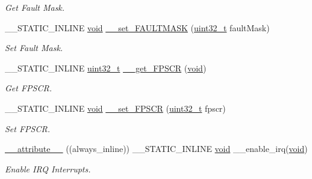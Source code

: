 \begin{DoxyCompactItemize}
\begin{DoxyCompactList}\small\item\em Get Fault Mask. \end{DoxyCompactList}\item 
\-\_\-\-\_\-\-S\-T\-A\-T\-I\-C\-\_\-\-I\-N\-L\-I\-N\-E \hyperlink{group___n_a_m_e_ga18028b8badbf1ea7e704ccac3c488e82}{void} \hyperlink{group___c_m_s_i_s___core___reg_acc_functions_gaa5587cc09031053a40a35c14ec36078a}{\-\_\-\-\_\-set\-\_\-\-F\-A\-U\-L\-T\-M\-A\-S\-K} (\hyperlink{stdint_8h_a435d1572bf3f880d55459d9805097f62}{uint32\-\_\-t} fault\-Mask)
\begin{DoxyCompactList}\small\item\em Set Fault Mask. \end{DoxyCompactList}\item 
\-\_\-\-\_\-\-S\-T\-A\-T\-I\-C\-\_\-\-I\-N\-L\-I\-N\-E \hyperlink{stdint_8h_a435d1572bf3f880d55459d9805097f62}{uint32\-\_\-t} \hyperlink{group___c_m_s_i_s___core___reg_acc_functions_ga6a275172e274ea7ce6c22030d07c6c64}{\-\_\-\-\_\-get\-\_\-\-F\-P\-S\-C\-R} (\hyperlink{group___n_a_m_e_ga18028b8badbf1ea7e704ccac3c488e82}{void})
\begin{DoxyCompactList}\small\item\em Get F\-P\-S\-C\-R. \end{DoxyCompactList}\item 
\-\_\-\-\_\-\-S\-T\-A\-T\-I\-C\-\_\-\-I\-N\-L\-I\-N\-E \hyperlink{group___n_a_m_e_ga18028b8badbf1ea7e704ccac3c488e82}{void} \hyperlink{group___c_m_s_i_s___core___reg_acc_functions_ga17c6ff443c52c74125fefef7de5fee1d}{\-\_\-\-\_\-set\-\_\-\-F\-P\-S\-C\-R} (\hyperlink{stdint_8h_a435d1572bf3f880d55459d9805097f62}{uint32\-\_\-t} fpscr)
\begin{DoxyCompactList}\small\item\em Set F\-P\-S\-C\-R. \end{DoxyCompactList}\item 
\hyperlink{group___c_m_s_i_s___core___reg_acc_functions_ga671b4fa3b3ab3dbc685a5473f3fc76aa}{\-\_\-\-\_\-attribute\-\_\-\-\_\-} ((always\-\_\-inline)) \-\_\-\-\_\-\-S\-T\-A\-T\-I\-C\-\_\-\-I\-N\-L\-I\-N\-E \hyperlink{group___n_a_m_e_ga18028b8badbf1ea7e704ccac3c488e82}{void} \-\_\-\-\_\-enable\-\_\-irq(\hyperlink{group___n_a_m_e_ga18028b8badbf1ea7e704ccac3c488e82}{void})
\begin{DoxyCompactList}\small\item\em Enable I\-R\-Q Interrupts. \end{DoxyCompactList}\end{DoxyCompactItemize}
